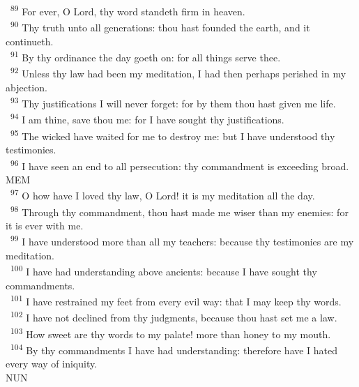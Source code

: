 \documentclass[a5paper,12pt]{article}
\begin{document}
\begin{multicols*}{2}
~\textsuperscript{89} For ever, O Lord, thy word standeth firm in heaven.\\
~\textsuperscript{90} Thy truth unto all generations: thou hast founded the earth, and it continueth.\\
~\textsuperscript{91} By thy ordinance the day goeth on: for all things serve thee.\\
~\textsuperscript{92} Unless thy law had been my meditation, I had then perhaps perished in my abjection.\\
~\textsuperscript{93} Thy justifications I will never forget: for by them thou hast given me life.\\
~\textsuperscript{94} I am thine, save thou me: for I have sought thy justifications.\\
~\textsuperscript{95} The wicked have waited for me to destroy me: but I have understood thy testimonies.\\
~\textsuperscript{96} I have seen an end to all persecution: thy commandment is exceeding broad.\\

MEM\\

~\textsuperscript{97} O how have I loved thy law, O Lord! it is my meditation all the day.\\
~\textsuperscript{98} Through thy commandment, thou hast made me wiser than my enemies: for it is ever with me.\\
~\textsuperscript{99} I have understood more than all my teachers: because thy testimonies are my meditation.\\
~\textsuperscript{100} I have had understanding above ancients: because I have sought thy commandments.\\
~\textsuperscript{101} I have restrained my feet from every evil way: that I may keep thy words.\\
~\textsuperscript{102} I have not declined from thy judgments, because thou hast set me a law.\\
~\textsuperscript{103} How sweet are thy words to my palate! more than honey to my mouth.\\
~\textsuperscript{104} By thy commandments I have had understanding: therefore have I hated every way of iniquity.\\

NUN\\


\end{multicols*}
\end{document}
